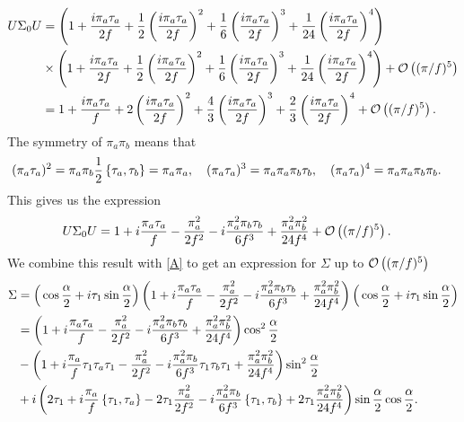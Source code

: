 \begin{align*}
    U\Sigma_0U & = 
    \left(
        1
        + \frac{i \pi_a \tau_a}{2f} 
        + \frac{1}{2}\left(\frac{i \pi_a \tau_a}{2f}\right)^2 
        + \frac{1}{6}\left(\frac{i \pi_a \tau_a}{2f}\right)^3 
        + \frac{1}{24}\left(\frac{i \pi_a \tau_a}{2f}\right)^4 
    \right)\\
    & \times
    \left(
        1
        + \frac{i \pi_a \tau_a}{2f} 
        + \frac{1}{2}\left(\frac{i \pi_a \tau_a}{2f}\right)^2 
        + \frac{1}{6}\left(\frac{i \pi_a \tau_a}{2f}\right)^3 
        + \frac{1}{24}\left(\frac{i \pi_a \tau_a}{2f}\right)^4 
    \right)
    + \Oh[5]{(\pi/f)}\\
    &=
    1 + \frac{i \pi_a \tau_a}{f}
    + 2 \left( \frac{i \pi_a \tau_a}{2f} \right)^2
    + \frac{4}{3} \left( \frac{i \pi_a \tau_a}{2f} \right)^3
    + \frac{2}{3} \left( \frac{i \pi_a \tau_a}{2f} \right)^4
    + \Oh[5]{(\pi/f)}.
\end{align*}
The symmetry of $\pi_a\pi_b$ means that
\begin{align*}
    & (\pi_a \tau_a)^2
    = 
    \pi_a \pi_b \frac{1}{2} \acom{\tau_a}{\tau_b} 
    =
    \pi_a \pi_a, \quad
    (\pi_a \tau_a)^3
    =
    \pi_a \pi_a \pi_b \tau_b,\quad
    (\pi_a \tau_a)^4
    =
    \pi_a \pi_a \pi_b \pi_b.
\end{align*}
This gives us the expression
\begin{align*}
    & U\Sigma_0U 
    =
    1
    + i \frac{\pi_a \tau_a}{f} 
    - \frac{\pi_a^2}{2f^2}
    - i \frac{\pi_a^2\pi_b \tau_b}{6f^3}
    + \frac{\pi_a^2\pi_b^2}{24f^4}
    + \Oh[5]{(\pi/f)}.
\end{align*}
We combine this result with \autoref{A} to get an expression for $\Sigma$ up to $\Oh[5]{(\pi/f)}$
\begin{align*}
    \Sigma & =  \Big( \cos{\frac{\alpha}{2}} + i \tau_1 \sin{\frac{\alpha}{2}} \Big) 
    \left(
        1
        + i \frac{\pi_a \tau_a}{f} 
        - \frac{\pi_a^2}{2f^2}
        - i \frac{\pi_a^2\pi_b \tau_b}{6f^3}
        + \frac{\pi_a^2\pi_b^2}{24f^4}    
    \right)
    \Big( \cos{\frac{\alpha}{2}} + i \tau_1 \sin{\frac{\alpha}{2}} \Big) \\
    & =
    \left(
        1
        + i \frac{\pi_a \tau_a}{f} 
        - \frac{\pi_a^2}{2f^2}
        - i \frac{\pi_a^2\pi_b \tau_b}{6f^3}
        + \frac{\pi_a^2\pi_b^2}{24f^4}    
    \right)
    \cos^2{\frac{\alpha}{2}} \\
    & -
    \left(
        1
        + i \frac{\pi_a}{f} \tau_1\tau_a\tau_1
        - \frac{\pi_a^2}{2f^2}
        - i \frac{\pi_a^2\pi_b}{6f^3} \tau_1\tau_b\tau_1
        + \frac{\pi_a^2\pi_b^2}{24f^4}
    \right)
    \sin^2{\frac{\alpha}{2}}\\
    & + i
    \left(
        2 \tau_1
        + i \frac{\pi_a}{f} \acom{\tau_1}{\tau_a}
        - 2\tau_1 \frac{\pi_a^2}{2f^2}
        - i \frac{\pi_a^2\pi_b}{6f^3} \acom{\tau_1}{\tau_b}
        + 2\tau_1 \frac{\pi_a^2\pi_b^2}{24f^4}
    \right)
    \sin{\frac{\alpha}{2}}\cos{\frac{\alpha}{2}}.
\end{align*}
